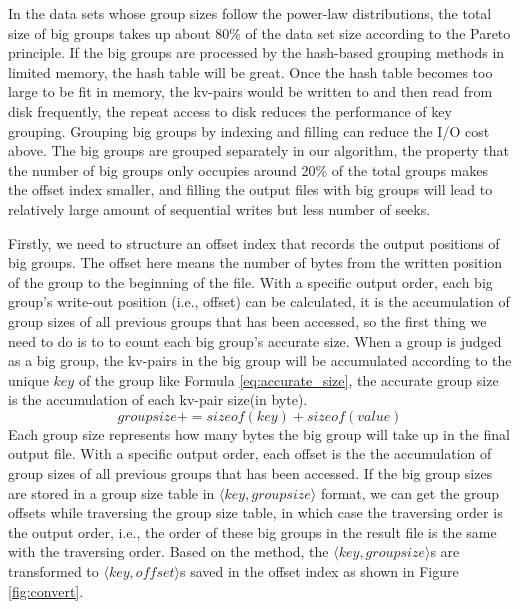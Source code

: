 In the data sets whose group sizes follow the power-law distributions, the total size of big groups takes up about 80\% of the data set size according to the Pareto principle. If the big groups are processed by the hash-based grouping methods in limited memory, the hash table will be great. Once the hash table becomes too large to be fit in memory, the kv-pairs would be written to and then read from disk frequently, the repeat access to disk reduces the performance of key grouping. Grouping big groups by indexing and filling can reduce the I/O cost above. The big groups are grouped separately in our algorithm, the property that the number of big groups only occupies around 20\% of the total groups makes the offset index smaller, and filling the output files with big groups will lead to relatively large amount of sequential writes but less number of seeks. 

Firstly, we need to structure an offset index that records the output positions of big groups. The offset here means the number of bytes from the written position of the group to the beginning of the file. With a specific output order, each big group's write-out position (i.e., offset) can be calculated, it is the accumulation of group sizes of all previous groups that has been accessed, so the first thing we need to do is to to count each big group's accurate size. When a group is judged as a big group, the kv-pairs in the big group will be accumulated according to the unique $key$ of the group like Formula \ref{eq:accurate_size}, the accurate group size is the accumulation of each kv-pair size(in byte).
\begin{equation}\label{eq:accurate_size}
    groupsize += sizeof(key) + sizeof(value)
\end{equation}
Each group size represents how many bytes the big group will take up in the final output file. With a specific output order, each offset is the
the accumulation of group sizes of all previous groups that has been accessed. If the big group sizes are stored in a group size table in $\langle key, groupsize\rangle$ format, we can get the group offsets while traversing the group size table, in which case the traversing order is the output order, i.e., the order of these big groups in the result file is the same with the traversing order. Based on the method, the $\langle key, groupsize\rangle$s are transformed to $\langle key, offset\rangle$s saved in the offset index as shown in Figure \ref{fig:convert}.

